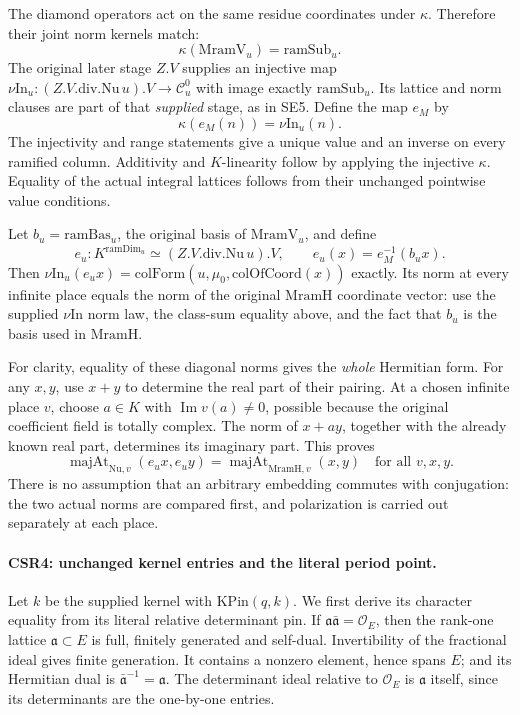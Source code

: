 The diamond operators act on the same residue coordinates under
\(\kappa\). Therefore their joint norm kernels match:
\[
 \kappa(\mathrm{MramV}_u)=\mathrm{ramSub}_u .
 \tag{CSR.7}
\]
The original later stage \(Z.V\) supplies an injective map
\(\nu\mathrm{In}_u:(Z.V.\mathrm{div.Nu}\,u).V\to\mathcal C_u^{0}\)
with image exactly \(\mathrm{ramSub}_u\). Its lattice and norm
clauses are part of that \emph{supplied} stage, as in SE5.
Define the map \(e_M\) by
\[
                  \kappa(e_M(n))=\nu\mathrm{In}_u(n).
 \tag{CSR.8}
\]
The injectivity and range statements give a unique value and an
inverse on every ramified column. Additivity and \(K\)-linearity
follow by applying the injective \(\kappa\). Equality of the actual
integral lattices follows from their unchanged pointwise value
conditions.

Let \(b_u=\mathrm{ramBas}_u\), the original basis of
\(\mathrm{MramV}_u\), and define
\[
 e_u:K^{\mathrm{ramDim}_u}\simeq(Z.V.\mathrm{div.Nu}\,u).V,
 \qquad e_u(x)=e_M^{-1}(b_u x).
 \tag{CSR.9}
\]
Then
\(\nu\mathrm{In}_u(e_u x)=\mathrm{colForm}(u,\mu_0,
\mathrm{colOfCoord}(x))\) exactly. Its norm at every infinite place
equals the norm of the original \(\mathrm{MramH}\) coordinate vector:
use the supplied \(\nu\mathrm{In}\) norm law, the class-sum equality
above, and the fact that \(b_u\) is the basis used in
\(\mathrm{MramH}\).

For clarity, equality of these diagonal norms gives the \emph{whole}
Hermitian form. For any \(x,y\), use \(x+y\) to determine the real
part of their pairing. At a chosen infinite place \(v\), choose
\(a\in K\) with \(\operatorname{Im}v(a)\ne0\), possible because the
original coefficient field is totally complex. The norm of \(x+ay\),
together with the already known real part, determines its imaginary
part. This proves
\[
 \operatorname{majAt}_{\mathrm{Nu},v}(e_u x,e_u y)
      =\operatorname{majAt}_{\mathrm{MramH},v}(x,y)
 \quad\text{for all }v,x,y.                                    \tag{CSR.10}
\]
There is no assumption that an arbitrary embedding commutes with
conjugation: the two actual norms are compared first, and
polarization is carried out separately at each place.

\paragraph{CSR4: unchanged kernel entries and the literal period point.}
\label{claim:CSR4}
Let \(k\) be the supplied kernel with \(\mathrm{KPin}(q,k)\).
We first derive its character equality from its literal relative
determinant pin. If \(\mathfrak a\bar{\mathfrak a}=\mathcal O_E\),
then the rank-one lattice \(\mathfrak a\subset E\) is full,
finitely generated and self-dual. Invertibility of the
fractional ideal gives finite generation. It contains a
nonzero element, hence spans \(E\); and its Hermitian dual is
\(\bar{\mathfrak a}^{-1}=\mathfrak a\).
The determinant ideal relative to \(\mathcal O_E\) is
\(\mathfrak a\) itself, since its determinants are the
one-by-one entries.

